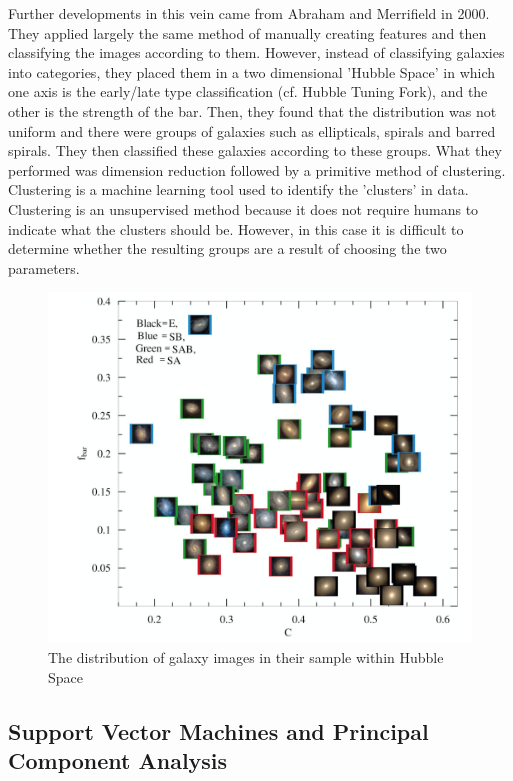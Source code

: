\documentclass[a4paper,11pt]{article}
\begin{document}
Further developments in this vein came from Abraham and Merrifield in 2000.\cite{abraham_2000_explorations} They applied largely the same method of manually creating features and then classifying the images according to them. However, instead of classifying galaxies into categories, they placed them in a two dimensional 'Hubble Space' in which one axis is the early/late type classification (cf. Hubble Tuning Fork), and the other is the strength of the bar. Then, they found that the distribution was not uniform and there were groups of galaxies such as ellipticals, spirals and barred spirals. They then classified these galaxies according to these groups. What they  performed was dimension reduction followed by a primitive method of clustering. Clustering is a machine learning tool used to identify the 'clusters' in data. Clustering is an unsupervised method because it does not require humans to indicate what the clusters should be. However, in this case it is difficult to determine whether the resulting groups are a result of choosing the two parameters. 
\begin{figure}[ht]
\centering
\includegraphics[width=\textwidth]{Abraham.png}
\caption{\label{fig:Galaxies}The distribution of galaxy images in their sample within Hubble Space}
\end{figure}

\subsection{Support Vector Machines and Principal Component Analysis}
\end{document}
